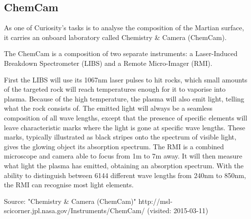 \subsection{ChemCam}
As one of Curiosity's tasks is to analyse the composition of the Martian surface, it carries an onboard laboratory called Chemistry & Camera (ChemCam).

The ChemCam is a composition of two separate instruments: a Laser-Induced Breakdown Spectrometer (LIBS) and a Remote Micro-Imager (RMI).

First the LIBS will use its 1067nm laser pulses to hit rocks, which small amounts of the targeted rock will reach temperatures enough for it to vaporise into plasma.
Because of the high temperature, the plasma will also emit light, telling what the rock consists of.
The emitted light will always be a seamless composition of all wave lengths, except that the presence of specific elements will leave characteristic marks where the light is gone at specific wave lengths.
These marks, typically illustrated as black stripes onto the spectrum of visible light, gives the glowing object its absorption spectrum.
The RMI is a combined microscope and camera able to focus from 1m to 7m away.
It will then measure what light the plasma has emitted, obtaining an absorption spectrum.
With the ability to distinguish between 6144 different wave lengths from 240nm to 850nm, the RMI can recognise most light elements.

Source:
"Chemistry & Camera (ChemCam)"
http://msl-scicorner.jpl.nasa.gov/Instruments/ChemCam/ (visited: 2015-03-11)